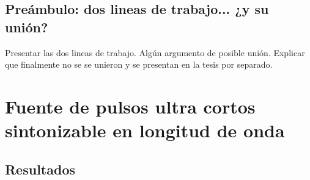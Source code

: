 \documentclass[a4paper,twoside,openright]{book}
\begin{document}
\newpage
\thispagestyle{empty}

\chapter{Preámbulo: dos lineas de trabajo... ¿y su unión?}
Presentar las dos lineas de trabajo.
Algún argumento de posible unión.
Explicar que finalmente no se se unieron y se presentan en la tesis por separado.


\mainmatter

\part{Fuente de pulsos ultra cortos sintonizable en longitud de onda}









\chapter{Resultados}






\end{document}

